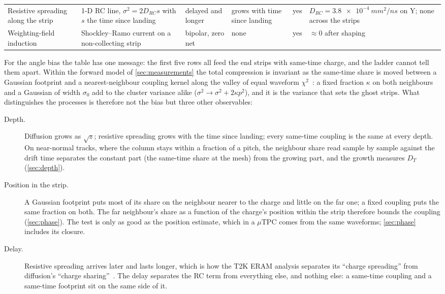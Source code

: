 \begin{table}[t]
\begin{tabular}{@{}p{2.7cm}p{3.1cm}p{1.8cm}p{1.6cm}p{1.6cm}p{2.8cm}@{}}
    Resistive spreading along the strip & 1-D RC line, $\sigma^2 = 2 D_{RC} s$ with $s$ the time since landing & delayed and longer & grows with time since landing & yes & $D_{RC} = \SI{3.8e-4}{mm^2/ns}$ on Y; none across the strips \\
    Weighting-field induction & Shockley--Ramo current on a non-collecting strip & bipolar, zero net & none & yes & $\approx 0$ after shaping \\
    \bottomrule
  \end{tabular}
\end{table}

For the angle bias the table has one message: the first five rows all feed the end strips with same-time charge, and the
ladder cannot tell them apart. Within the forward model of \cref{sec:measurements} the total compression is invariant as the
same-time share is moved between a Gaussian footprint and a nearest-neighbour coupling kernel along the valley of equal
waveform $\chi^2$~\cite{paperII}: a fixed fraction $\kappa$ on both neighbours and a Gaussian of width $\sigma_0$ add to the cluster
variance alike ($\sigma^2 \to \sigma^2 + 2\kappa p^2$), and it is the variance that sets the ghost strips. What distinguishes the
processes is therefore not the bias but three other observables:

\begin{description}
\item[Depth.] Diffusion grows as $\sqrt{z}$; resistive spreading grows with the time since landing; every same-time coupling
  is the same at every depth. On near-normal tracks, where the column stays within a fraction of a pitch, the neighbour share
  read sample by sample against the drift time separates the constant part (the same-time share at the mesh) from the growing
  part, and the growth measures $D_T$ (\cref{sec:depth}).
\item[Position in the strip.] A Gaussian footprint puts most of its share on the neighbour nearer to the charge and little on
  the far one; a fixed coupling puts the same fraction on both. The far neighbour's share as a function of the charge's
  position within the strip therefore bounds the coupling (\cref{sec:phase}). The test is only as good as the position
  estimate, which in a $\mu$TPC comes from the same waveforms; \cref{sec:phase} includes its closure.
\item[Delay.] Resistive spreading arrives later and lasts longer, which is how the T2K ERAM analysis separates its ``charge
  spreading'' from diffusion's ``charge sharing''~\cite{T2K2022}. The delay separates the RC term from everything else, and
  nothing else: a same-time coupling and a same-time footprint sit on the same side of it.
\end{description}

